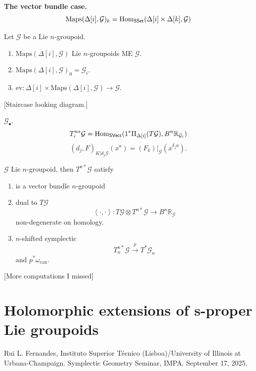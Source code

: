 \medskip\noindent
{\bf The vector bundle case.}
$$
\text{Maps}(\Delta[i],\mathcal{G})_k=
\mathop{\mathrm{Hom}}\nolimits_{\mathsf{SSet}}(\Delta[i]\times\Delta[k]
,\mathcal{G})
$$
\begin{proposition}
\label{proposition-on-an-n-Lie-groupoid}
Let $\mathcal{G}$ be a Lie $n$-groupoid.
\begin{enumerate}
\item $\text{Maps}(\Delta[i],\mathcal{G})$
Lie $n$-groupoids ME $\mathcal{G}$.
\item
$\text{Maps}(\Delta[i],\mathcal{G})_0=
\mathcal{G}_i$.
\item $\text{ev}:\Delta[i]\times
\text{Maps}(\Delta[i],\mathcal{G})\to
\mathcal{G}$.
\end{enumerate}
\end{proposition}

[Staircase looking diagram.]

\begin{definition}
\label{definition-what-is-this}
$\mathcal{G}_\bullet$.
$$
T_i^{n*}\mathcal{G}=\mathop{\mathrm{Hom}}\nolimits_{\mathsf{SVect}}(1^*
\Pi_{\Delta[i]}(T\mathcal{G}),
B^n\mathbb{R}_{\mathcal{G}_i})
$$
$$
(d_j,F)_{K|d_j\mathcal{G}}(x^a)=(F_k)
|_{\mathcal{G}}(x^{\delta_ja}).
$$
\end{definition}

\begin{proposition}
\label{proposition-properties-of-that}
$\mathcal{G}$ Lie $n$-groupoid, then
$T^{n*}\mathcal{G}$ satisfy
\begin{enumerate}
\item is a vector bundle $n$-groupoid
\item dual to $T\mathcal{G}$
$$
\left\langle{}\cdot,\cdot\right\rangle{}:T\mathcal{G} \otimes
T^{n*}\mathcal{G}
\to B^n\mathbb{R}_{\mathcal{G}}
$$
non-degenerate on homology.
\item $n$-shifted symplectic
$$
T^{n*}_n\mathcal{G}\overset{p}{\to}
T^*\mathcal{G}_n
$$
and $p^*\omega_{\text{can}}$.
\end{enumerate}
\end{proposition}

[More computations I missed]

\section{Holomorphic extensions of s-proper
Lie groupoids}
\label{section-holom-exten-s-prope-lie}

\noindent
Rui L. Fernandes, Instituto Superior Técnico
(Lisboa)/University of Illinois
at Urbana-Champaign.
Symplectic Geometry Seminar, IMPA.
September 17, 2025.

